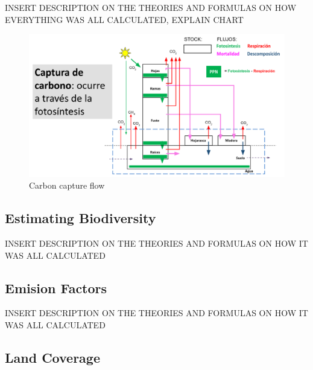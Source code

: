 \documentclass[
]{jss}
\begin{document}
INSERT DESCRIPTION ON THE THEORIES AND FORMULAS ON HOW EVERYTHING WAS
ALL CALCULATED, EXPLAIN CHART

\begin{figure}
\centering
\includegraphics{figures/carbon-capture.png}
\caption{Carbon capture flow}
\end{figure}

\hypertarget{estimating-biodiversity}{%
\subsection{Estimating Biodiversity}\label{estimating-biodiversity}}

INSERT DESCRIPTION ON THE THEORIES AND FORMULAS ON HOW IT WAS ALL
CALCULATED

\hypertarget{emision-factors}{%
\subsection{Emision Factors}\label{emision-factors}}

INSERT DESCRIPTION ON THE THEORIES AND FORMULAS ON HOW IT WAS ALL
CALCULATED

\hypertarget{land-coverage}{%
\subsection{Land Coverage}\label{land-coverage}}
\end{document}
